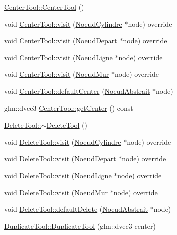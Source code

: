 \begin{DoxyCompactItemize}
\item 
\hyperlink{group__inf2990_ga3814d534b50e7dff7fbd7efef552685d}{Center\+Tool\+::\+Center\+Tool} ()
\item 
void \hyperlink{group__inf2990_ga9ceff880a444e12bc6b4dab4313c1809}{Center\+Tool\+::visit} (\hyperlink{class_noeud_cylindre}{Noeud\+Cylindre} $\ast$node) override
\item 
void \hyperlink{group__inf2990_ga8417547d629ccacfa218979e6ba6cdf5}{Center\+Tool\+::visit} (\hyperlink{class_noeud_depart}{Noeud\+Depart} $\ast$node) override
\item 
void \hyperlink{group__inf2990_ga2edfc60eff7382474a31c34d627ea348}{Center\+Tool\+::visit} (\hyperlink{class_noeud_ligne}{Noeud\+Ligne} $\ast$node) override
\item 
void \hyperlink{group__inf2990_ga13d2bac067f4262be4fd60c302a07124}{Center\+Tool\+::visit} (\hyperlink{class_noeud_mur}{Noeud\+Mur} $\ast$node) override
\item 
void \hyperlink{group__inf2990_gab64cc9d2d491c0bd04a1efc4756740df}{Center\+Tool\+::default\+Center} (\hyperlink{class_noeud_abstrait}{Noeud\+Abstrait} $\ast$node)
\item 
glm\+::dvec3 \hyperlink{group__inf2990_gaf086e5f530c5189f4b72563a4abfe35f}{Center\+Tool\+::get\+Center} () const 
\item 
\hyperlink{group__inf2990_ga4a54f710ae3ca5e4eb8e16610d07c3bc}{Delete\+Tool\+::$\sim$\+Delete\+Tool} ()
\item 
void \hyperlink{group__inf2990_gaf91f134881ce52596486855f405e8f96}{Delete\+Tool\+::visit} (\hyperlink{class_noeud_cylindre}{Noeud\+Cylindre} $\ast$node) override
\item 
void \hyperlink{group__inf2990_ga9efc126da05a809724a3a2597ac4cb57}{Delete\+Tool\+::visit} (\hyperlink{class_noeud_depart}{Noeud\+Depart} $\ast$node) override
\item 
void \hyperlink{group__inf2990_gae485844dc100a1cba6294cfbe6675626}{Delete\+Tool\+::visit} (\hyperlink{class_noeud_ligne}{Noeud\+Ligne} $\ast$node) override
\item 
void \hyperlink{group__inf2990_ga816147276bc393b0552e031441541726}{Delete\+Tool\+::visit} (\hyperlink{class_noeud_mur}{Noeud\+Mur} $\ast$node) override
\item 
void \hyperlink{group__inf2990_gab16541bc54ef7e060c56d59d64798805}{Delete\+Tool\+::default\+Delete} (\hyperlink{class_noeud_abstrait}{Noeud\+Abstrait} $\ast$node)
\item 
\hyperlink{group__inf2990_ga13dd0524e005f4a44dbaeea9f237d761}{Duplicate\+Tool\+::\+Duplicate\+Tool} (glm\+::dvec3 center)

\end{DoxyCompactItemize}
